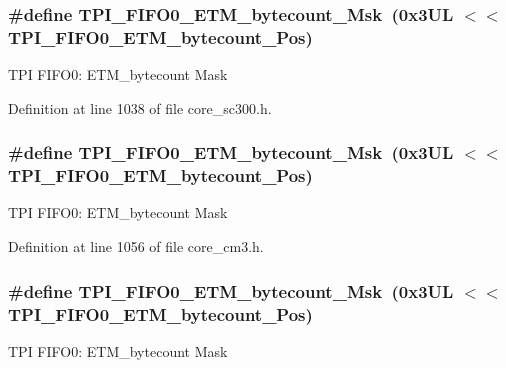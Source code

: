 \subsubsection[{\texorpdfstring{T\+P\+I\+\_\+\+F\+I\+F\+O0\+\_\+\+E\+T\+M\+\_\+bytecount\+\_\+\+Msk}{TPI_FIFO0_ETM_bytecount_Msk}}]{\setlength{\rightskip}{0pt plus 5cm}\#define T\+P\+I\+\_\+\+F\+I\+F\+O0\+\_\+\+E\+T\+M\+\_\+bytecount\+\_\+\+Msk~(0x3\+U\+L $<$$<$ T\+P\+I\+\_\+\+F\+I\+F\+O0\+\_\+\+E\+T\+M\+\_\+bytecount\+\_\+\+Pos)}\hypertarget{group___c_m_s_i_s___t_p_i_gad2536b3a935361c68453cd068640af92}{}\label{group___c_m_s_i_s___t_p_i_gad2536b3a935361c68453cd068640af92}
T\+PI F\+I\+F\+O0\+: E\+T\+M\+\_\+bytecount Mask 

Definition at line 1038 of file core\+\_\+sc300.\+h.

\subsubsection[{\texorpdfstring{T\+P\+I\+\_\+\+F\+I\+F\+O0\+\_\+\+E\+T\+M\+\_\+bytecount\+\_\+\+Msk}{TPI_FIFO0_ETM_bytecount_Msk}}]{\setlength{\rightskip}{0pt plus 5cm}\#define T\+P\+I\+\_\+\+F\+I\+F\+O0\+\_\+\+E\+T\+M\+\_\+bytecount\+\_\+\+Msk~(0x3\+U\+L $<$$<$ T\+P\+I\+\_\+\+F\+I\+F\+O0\+\_\+\+E\+T\+M\+\_\+bytecount\+\_\+\+Pos)}\hypertarget{group___c_m_s_i_s___t_p_i_gad2536b3a935361c68453cd068640af92}{}\label{group___c_m_s_i_s___t_p_i_gad2536b3a935361c68453cd068640af92}
T\+PI F\+I\+F\+O0\+: E\+T\+M\+\_\+bytecount Mask 

Definition at line 1056 of file core\+\_\+cm3.\+h.

\subsubsection[{\texorpdfstring{T\+P\+I\+\_\+\+F\+I\+F\+O0\+\_\+\+E\+T\+M\+\_\+bytecount\+\_\+\+Msk}{TPI_FIFO0_ETM_bytecount_Msk}}]{\setlength{\rightskip}{0pt plus 5cm}\#define T\+P\+I\+\_\+\+F\+I\+F\+O0\+\_\+\+E\+T\+M\+\_\+bytecount\+\_\+\+Msk~(0x3\+U\+L $<$$<$ T\+P\+I\+\_\+\+F\+I\+F\+O0\+\_\+\+E\+T\+M\+\_\+bytecount\+\_\+\+Pos)}\hypertarget{group___c_m_s_i_s___t_p_i_gad2536b3a935361c68453cd068640af92}{}\label{group___c_m_s_i_s___t_p_i_gad2536b3a935361c68453cd068640af92}
T\+PI F\+I\+F\+O0\+: E\+T\+M\+\_\+bytecount Mask 

